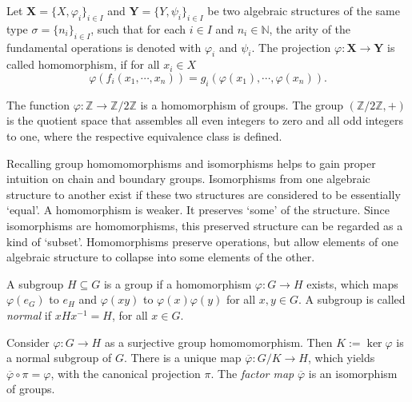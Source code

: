 \documentclass[envcountsect,runningheads]{llncs}
\begin{document}
\begin{definition}
Let $\textbf{X} = \{X,\varphi_i\}_{i \in I}$ and $\textbf{Y} = \{Y,\psi_i\}_{i \in I}$ be two algebraic structures of the same type $\sigma = \{n_i\}_{i\in I}$, such that for each $i \in I$ and $n_i \in \mathbb{N}$, the arity of the fundamental operations is denoted with $\varphi_i$ and $\psi_i$. The projection $\varphi: \textbf{X} \rightarrow \textbf{Y}$ is called homomorphism, if for all $x_{i} \in X$
\begin{equation}
\varphi\left(f_i\left(x_{1},\cdots,x_{n}\right)\right) = g_i\left(\varphi\left(x_{1}\right),\cdots,\varphi\left(x_{n}\right)\right).
\end{equation}
\end{definition}

\begin{example}
The function $\varphi: \mathbb{Z} \rightarrow \mathbb{Z}/2\mathbb{Z}$ is a homomorphism of groups. The group $(\mathbb{Z}/2\mathbb{Z},+)$ is the quotient space that assembles all even integers to zero and all odd integers to one, where the respective equivalence class is defined.
\end{example}

\begin{remark}
Recalling group homomomorphisms and isomorphisms helps to gain proper intuition on chain and boundary groups. Isomorphisms from one algebraic structure to another exist if these two structures are considered to be essentially `equal'. A homomorphism is weaker. It preserves `some' of the structure. Since isomorphisms are homomorphisms, this preserved structure can be regarded as a kind of `subset'. Homomorphisms preserve operations, but allow elements of one algebraic structure to collapse into some elements of the other. 
\end{remark}

\begin{definition}
A subgroup $H \subseteq G$ is a group if a homomorphism $\varphi: G \rightarrow H$ exists, which maps $\varphi(e_G)$ to $e_H$ and $\varphi(xy)$ to $\varphi(x)\varphi(y)$ for all $x,y \in G$. A subgroup is called \emph{normal} if $xHx^{-1} = H$, for all $x \in G$.
\end{definition}

\begin{example}{\cite[p.~5]{van2003lie}}
Consider $\varphi:G\rightarrow H$ as a surjective group homomomorphism. Then $K := \ker \varphi$ is a normal subgroup of $G$. There is a unique map $\overline{\varphi}: G/K \rightarrow H$, which yields $\overline{\varphi} \circ \pi = \varphi$, with the canonical projection $\pi$. The \emph{factor map} $\overline{\varphi}$ is an isomorphism of groups.
\end{example}
\end{document}
